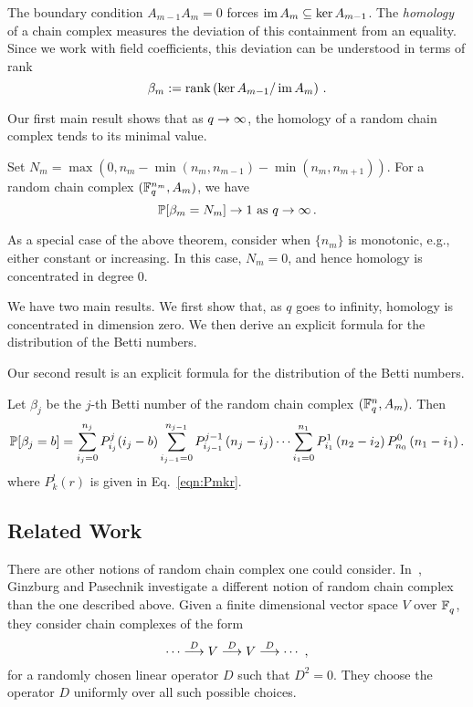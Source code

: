 The boundary condition $A_{m-1}A_m=0$ forces $\operatorname{\mathrm{im}} A_m \subseteq \ker A_{m-1}$.
The {\em homology} of a chain complex measures the deviation of this containment
from an equality. Since we work with field coefficients, this deviation can
be understood in terms of rank
\begin{equation}
  \beta_m := \mathrm{rank} \left(\ker A_{m-1} / \operatorname{\mathrm{im}} A_m \right)\, .
  \label{eqn:betti_numbers}
\end{equation}

Our first main result shows that as $q \rightarrow \infty$, the homology of a 
random chain complex tends to its minimal value.

\begin{theorem}
  \label{thm:qtoinfty}
  Set $N_m = \max(0,n_m - \min(n_{m},n_{m-1}) - \min(n_m,n_{m+1}))$. 
  For a random chain complex $(\mathbb{F}_q^{n_m},A_m)$, we have
  \[
    \mathbb{P}[\beta_m = N_m] \rightarrow 1 
    \mbox{ as } q \rightarrow \infty  \, .
  \]
\end{theorem}

\begin{remark}
  \label{rem:monotone}
  As a special case of the above theorem, consider when $\{n_m\}$
  is monotonic, e.g., either constant or increasing. In this case, 
  $N_m = 0$, and hence homology is concentrated in degree 0.
\end{remark}

We have two main results. We first show that, as $q$ goes to infinity, homology
is concentrated in dimension zero.  We then derive an explicit formula for the
distribution of the Betti numbers.

Our second result is an explicit formula for the distribution
of the Betti numbers.
\begin{theorem} 
  \label{thm:bettinum}
  Let $\beta_j$ be the $j$-th Betti number of the random chain complex
  $(\mathbb{F}_q^{n} , A_m)$. Then
  \[    
    \mathbb{P}[\beta_j = b] = \sum_{i_j=0}^{n_{j}} P_{i_j}^{j}(i_j-b)
    \sum_{i_{j-1}=0}^{n_{j-1}} P_{i_{j-1}}^{j-1}\left(n_{j} -i_j\right) \cdots
    \sum_{i_1 = 0}^{n_1} P_{i_1}^1\left(n_2 - i_2\right) P_{n_0}^0 \left(n_1 - i_1\right).
  \]
  where $P^l_k(r)$ is given in Eq.~\eqref{eqn:Pmkr}.
\end{theorem}

\subsection*{Related Work} There are other notions of random chain complex
one could consider. In~\cite{ginzburg2017random}, Ginzburg and Pasechnik investigate
a different notion of random chain complex than the one described above.
Given a finite dimensional vector space $V$ over $\mathbb{F}_q^{}$, they consider chain
complexes of the form
\[
  \cdots \stackrel{D}{\longrightarrow} V \stackrel{D}{\longrightarrow} V \stackrel{D}{\longrightarrow} \cdots \, \, ,
\]
for a randomly chosen linear operator $D$ such that $D^2 = 0$. They choose the 
operator $D$ uniformly over all such possible choices. 

